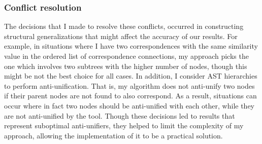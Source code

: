 
\subsubsection{Conflict resolution}  \label{conflicts}
The decisions that I made to resolve these conflicts, occurred in constructing structural generalizations that might affect the accuracy of our results.
For example, in situations where I have two correspondences with the same similarity value in the ordered list of correspondence connections, my approach picks the one which involves two subtrees with the higher number of nodes, though this might be not the best choice for all cases.
In addition, I consider AST hierarchies to perform anti-unification. That is, my algorithm does not anti-unify two nodes if their parent nodes are not found to also correspond. As a result, situations can occur where in fact two nodes should be anti-unified with each other, while they are not anti-unified by the tool. Though these decisions led to results that represent suboptimal anti-unifiers, they helped to limit the complexity of my approach, allowing the implementation of it to be a practical solution.








